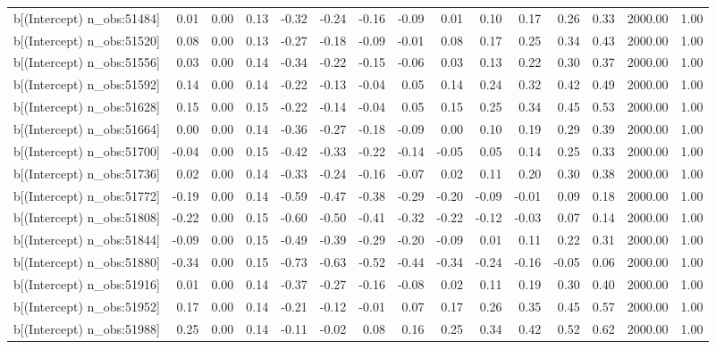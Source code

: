 \begin{table}[ht]
\begin{tabular}{rrrrrrrrrrrrrrr}
  b[(Intercept) n\_obs:51484] & 0.01 & 0.00 & 0.13 & -0.32 & -0.24 & -0.16 & -0.09 & 0.01 & 0.10 & 0.17 & 0.26 & 0.33 & 2000.00 & 1.00 \\ 
  b[(Intercept) n\_obs:51520] & 0.08 & 0.00 & 0.13 & -0.27 & -0.18 & -0.09 & -0.01 & 0.08 & 0.17 & 0.25 & 0.34 & 0.43 & 2000.00 & 1.00 \\ 
  b[(Intercept) n\_obs:51556] & 0.03 & 0.00 & 0.14 & -0.34 & -0.22 & -0.15 & -0.06 & 0.03 & 0.13 & 0.22 & 0.30 & 0.37 & 2000.00 & 1.00 \\ 
  b[(Intercept) n\_obs:51592] & 0.14 & 0.00 & 0.14 & -0.22 & -0.13 & -0.04 & 0.05 & 0.14 & 0.24 & 0.32 & 0.42 & 0.49 & 2000.00 & 1.00 \\ 
  b[(Intercept) n\_obs:51628] & 0.15 & 0.00 & 0.15 & -0.22 & -0.14 & -0.04 & 0.05 & 0.15 & 0.25 & 0.34 & 0.45 & 0.53 & 2000.00 & 1.00 \\ 
  b[(Intercept) n\_obs:51664] & 0.00 & 0.00 & 0.14 & -0.36 & -0.27 & -0.18 & -0.09 & 0.00 & 0.10 & 0.19 & 0.29 & 0.39 & 2000.00 & 1.00 \\ 
  b[(Intercept) n\_obs:51700] & -0.04 & 0.00 & 0.15 & -0.42 & -0.33 & -0.22 & -0.14 & -0.05 & 0.05 & 0.14 & 0.25 & 0.33 & 2000.00 & 1.00 \\ 
  b[(Intercept) n\_obs:51736] & 0.02 & 0.00 & 0.14 & -0.33 & -0.24 & -0.16 & -0.07 & 0.02 & 0.11 & 0.20 & 0.30 & 0.38 & 2000.00 & 1.00 \\ 
  b[(Intercept) n\_obs:51772] & -0.19 & 0.00 & 0.14 & -0.59 & -0.47 & -0.38 & -0.29 & -0.20 & -0.09 & -0.01 & 0.09 & 0.18 & 2000.00 & 1.00 \\ 
  b[(Intercept) n\_obs:51808] & -0.22 & 0.00 & 0.15 & -0.60 & -0.50 & -0.41 & -0.32 & -0.22 & -0.12 & -0.03 & 0.07 & 0.14 & 2000.00 & 1.00 \\ 
  b[(Intercept) n\_obs:51844] & -0.09 & 0.00 & 0.15 & -0.49 & -0.39 & -0.29 & -0.20 & -0.09 & 0.01 & 0.11 & 0.22 & 0.31 & 2000.00 & 1.00 \\ 
  b[(Intercept) n\_obs:51880] & -0.34 & 0.00 & 0.15 & -0.73 & -0.63 & -0.52 & -0.44 & -0.34 & -0.24 & -0.16 & -0.05 & 0.06 & 2000.00 & 1.00 \\ 
  b[(Intercept) n\_obs:51916] & 0.01 & 0.00 & 0.14 & -0.37 & -0.27 & -0.16 & -0.08 & 0.02 & 0.11 & 0.19 & 0.30 & 0.40 & 2000.00 & 1.00 \\ 
  b[(Intercept) n\_obs:51952] & 0.17 & 0.00 & 0.14 & -0.21 & -0.12 & -0.01 & 0.07 & 0.17 & 0.26 & 0.35 & 0.45 & 0.57 & 2000.00 & 1.00 \\ 
  b[(Intercept) n\_obs:51988] & 0.25 & 0.00 & 0.14 & -0.11 & -0.02 & 0.08 & 0.16 & 0.25 & 0.34 & 0.42 & 0.52 & 0.62 & 2000.00 & 1.00 \\ 

\end{tabular}
\end{table}
